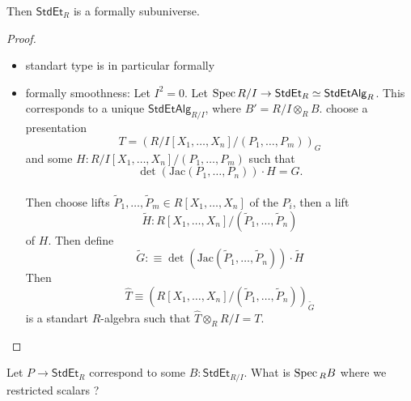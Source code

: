 \begin{lemma}{\label{lemma:StdEtSm}}
	Then $\mathsf{StdEt}_R$ is a formally \etale subuniverse. %
\end{lemma}
\begin{proof}
	\begin{itemize}
		\item standart \etale type is in particular formally \etale \todocite
		\item formally smoothness:
		Let $I^2 = 0$.
		Let $\operatorname{Spec}  R/ I \to \mathsf{StdEt}_R \simeq \mathsf{StdEtAlg}_{R}$. This corresponds to a unique $\mathsf{StdEtAlg}_{R/I}$, where $B' = R / I \otimes_R B$. choose a presentation
		\[
		T = \left (R/I[X_1,\hdots,X_n] / (P_1,\hdots,P_m) \right)_G
		\]
		and some $H : R/I[X_1,\hdots,X_n] / (P_1,\hdots,P_m)$ such that  
		\[\det (\mathrm{Jac}(P_1,\hdots,P_n)) \cdot H = G.\] \\
		Then choose lifts $\tilde P_1, \hdots, \tilde P_m \in R[X_1,\hdots,X_n]$ of the $P_i$, then a lift 
		\[\tilde H : R[X_1,\hdots,X_n] / (\tilde P_1 , \hdots, \tilde P_n)\]
		of $H$. Then define 
		\[
		\tilde G :\equiv \det (\mathrm{Jac}(\tilde P_1,\hdots, \tilde P_n)) \cdot \tilde H
		\]
		Then 
		\[\hat T \equiv \left(R[X_1,\hdots,X_n]  / (\tilde P_1,\hdots,\tilde P_n) \right)_{\tilde G} \]
		is a standart \etale $R$-algebra such that $\hat T \otimes_R R/ I = T$.
	\end{itemize}
\end{proof}
\begin{question}
	Let $P \to \mathsf{StdEt}_R$ correspond to some $B : \mathsf{StdEt}_{R / I}$. What is $\operatorname{Spec} {}_R B$ where we restricted scalars ?
\end{question}

